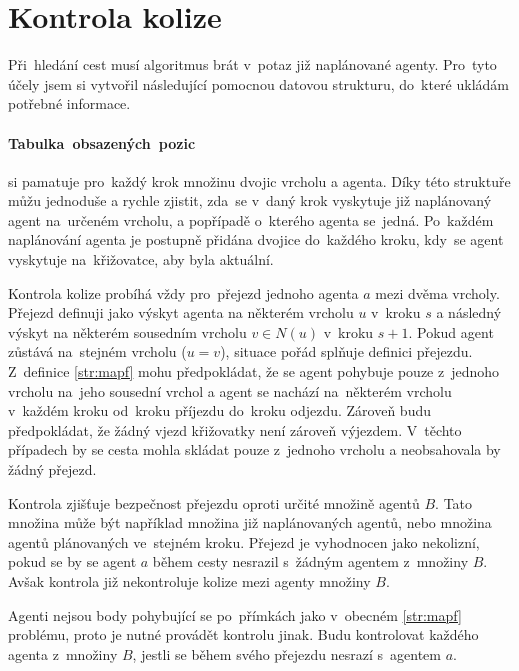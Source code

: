 \section{Kontrola kolize}\label{sec:kolize}


Při~hledání cest musí algoritmus brát v~potaz již naplánované agenty.
Pro~tyto účely jsem si vytvořil následující pomocnou datovou strukturu, do~které ukládám potřebné informace.

\paragraph{Tabulka~obsazených~pozic}\label{par:obsazene_pozice} si pamatuje pro~každý krok množinu dvojic vrcholu a agenta.
Díky této struktuře můžu jednoduše a rychle zjistit,
zda~se v~daný krok vyskytuje již naplánovaný agent na~určeném vrcholu, a popřípadě o~kterého agenta se~jedná.
Po~každém naplánování agenta je postupně přidána dvojice do~každého kroku, kdy~se agent vyskytuje na~křižovatce,
aby byla  aktuální.

Kontrola kolize probíhá vždy pro~přejezd jednoho agenta $a$ mezi dvěma vrcholy.
Přejezd definuji jako výskyt agenta na některém vrcholu $u$ v~kroku $s$
a následný výskyt na některém sousedním vrcholu $v \in N(u)$ v~kroku $s + 1$.
Pokud agent zůstává na~stejném vrcholu ($u = v$), situace pořád splňuje definici přejezdu.
Z~definice \ref{str:mapf} mohu předpokládat, že se agent pohybuje pouze z~jednoho vrcholu na~jeho sousední vrchol a
agent se nachází na~některém vrcholu v~každém kroku od~kroku příjezdu do~kroku odjezdu.
Zároveň budu předpokládat, že žádný vjezd křižovatky není zároveň výjezdem.
V~těchto případech by se cesta mohla skládat pouze z~jednoho vrcholu a neobsahovala by žádný přejezd.

Kontrola zjišťuje bezpečnost přejezdu oproti určité množině agentů $B$.
Tato množina může být například množina již naplánovaných agentů, nebo množina agentů plánovaných ve~stejném kroku.
Přejezd je vyhodnocen jako nekolizní, pokud se by se agent $a$ během cesty nesrazil s~žádným agentem z~množiny $B$.
Avšak kontrola již nekontroluje kolize mezi agenty množiny $B$.

Agenti nejsou body pohybující se po~přímkách jako v~obecném \ref{str:mapf} problému,
proto je nutné provádět kontrolu jinak.
Budu kontrolovat každého agenta z~množiny $B$, jestli se během svého přejezdu nesrazí s~agentem $a$.

